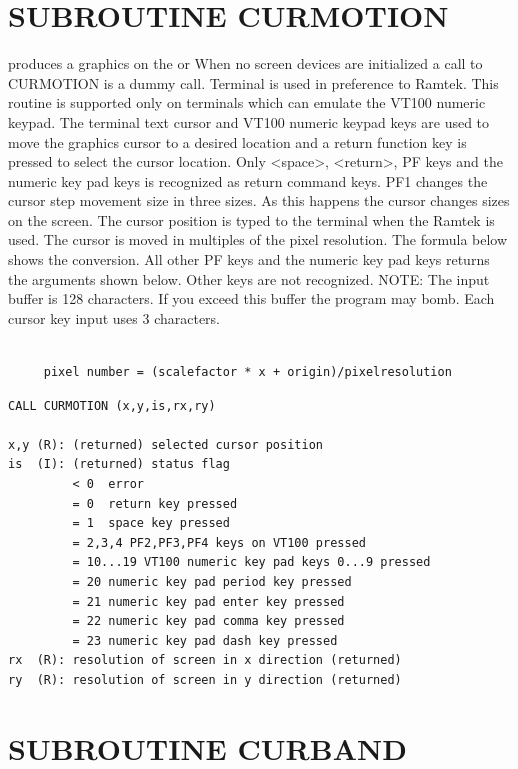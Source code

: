 \documentclass[11pt]{report}
\begin{document}
\section{SUBROUTINE CURMOTION}

 produces a graphics  on the  or 
When no screen devices are initialized a call to CURMOTION is a dummy
call.  Terminal is used in preference to Ramtek.  This routine is
supported only on terminals which can emulate the VT100 numeric
keypad.  The terminal text cursor and VT100 numeric keypad keys are
used to move the graphics cursor to a desired location and a return
function key is pressed to select the cursor location.  Only <space>,
<return>, PF keys and the numeric key pad keys is recognized as
return command keys.  PF1 changes the cursor step movement size in
three sizes. As this happens the cursor changes sizes on the screen.
The cursor position is typed to the terminal when the Ramtek is used.
The cursor is moved in multiples of the pixel resolution.  The formula
below shows the conversion.  All other PF keys and the numeric key pad
keys returns the arguments shown below.  Other keys are not
recognized.  NOTE: The input buffer is 128 characters.  If you exceed
this buffer the program may bomb.  Each cursor key input uses 3
characters.
\begin{verbatim}

     pixel number = (scalefactor * x + origin)/pixelresolution

\end{verbatim}
\begin{verbatim}
CALL CURMOTION (x,y,is,rx,ry)

x,y (R): (returned) selected cursor position
is  (I): (returned) status flag
         < 0  error
         = 0  return key pressed
         = 1  space key pressed
         = 2,3,4 PF2,PF3,PF4 keys on VT100 pressed
         = 10...19 VT100 numeric key pad keys 0...9 pressed
         = 20 numeric key pad period key pressed
         = 21 numeric key pad enter key pressed
         = 22 numeric key pad comma key pressed
         = 23 numeric key pad dash key pressed
rx  (R): resolution of screen in x direction (returned)
ry  (R): resolution of screen in y direction (returned)
\end{verbatim}

\section{SUBROUTINE CURBAND}
\end{document}
